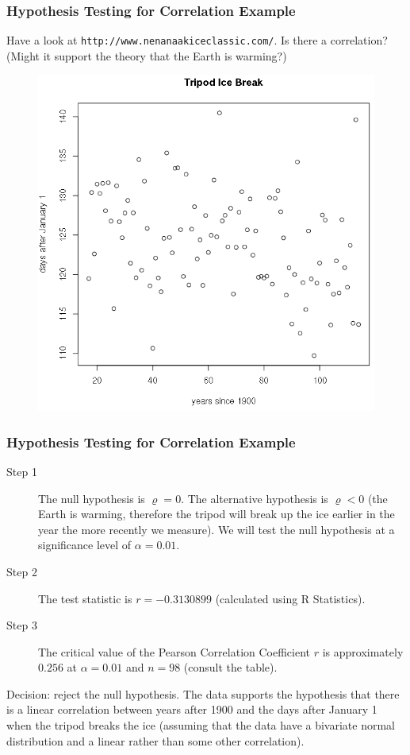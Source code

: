 \documentclass[xcolor=dvipsnames]{beamer}
\begin{document}
\begin{frame}
  \frametitle{Hypothesis Testing for Correlation Example}
   Have a look at
  \texttt{http://www.nenanaakiceclassic.com/}. Is there a correlation?
  (Might it support the theory that the Earth is warming?)
  \begin{figure}[h]
    \includegraphics[scale=0.3]{./diagrams/nenana-01.png}
  \end{figure}
\end{frame}

\begin{frame}
  \frametitle{Hypothesis Testing for Correlation Example}
  \begin{description}
  \item[Step 1] The null hypothesis is $\varrho=0$. The alternative
    hypothesis is $\varrho<0$ (the Earth is warming, therefore the
    tripod will break up the ice earlier in the year the more recently
    we measure). We will test the null hypothesis at a significance
    level of $\alpha=0.01$.
  \item[Step 2] The test statistic is $r=-0.3130899$ (calculated using
    R Statistics).
  \item[Step 3] The critical value of the Pearson Correlation
    Coefficient $r$ is approximately $0.256$ at $\alpha=0.01$ and
    $n=98$ (consult the table).
  \end{description}
  Decision: reject the null hypothesis. The data supports the
  hypothesis that there is a linear correlation between years after
  1900 and the days after January 1 when the tripod breaks the ice
  (assuming that the data have a bivariate normal distribution and a
  linear rather than some other correlation). 
\end{frame}
\end{document}
